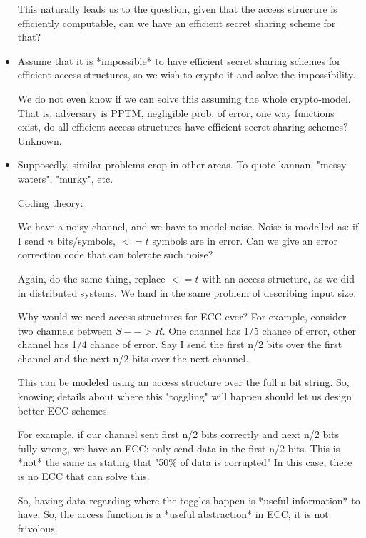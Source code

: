 \begin{itemize}
        This naturally leads us to the question, given that the access
        strucrure is efficiently computable, can we have an efficient
        secret sharing scheme for that?


    \item Assume that it is *impossible* to have efficient secret sharing
        schemes for efficient access structures, so we wish to crypto it
        and solve-the-impossibility.

        We do not even know if we can solve this assuming the whole crypto-model.
        That is, adversary is PPTM, negligible prob. of error, one way
        functions exist, do all efficient access structures have efficient
        secret sharing schemes? Unknown.

    \item Supposedly, similar problems crop in other areas. To quote kannan,
        "messy waters", "murky", etc.


        Coding theory:

        We have a noisy channel, and we have to model noise.
        Noise is modelled as: if I send $n$ bits/symbols, $<= t$ symbols
        are in error. Can we give an error correction code that can 
        tolerate such noise?

        Again, do the same thing, replace $<= t$ with an access structure, as
        we did in distributed systems.  We land in the same problem of
        describing input size.


        Why would we need access structures for ECC ever? For example, consider 
        two channels between $S --> R$. One channel has 1/5 chance of error,
        other channel has 1/4 chance of error. Say I send the first n/2 bits
        over the first channel and the next n/2 bits over the next channel.

        This can be modeled using an access structure over the full n bit
        string. So, knowing details about where this "toggling" will happen
        should let us design better ECC schemes.

        For example, if our channel sent first n/2 bits correctly and next
        n/2 bits fully wrong, we have an ECC: only send data in the first n/2
        bits. This is *not* the same as stating that "50\% of data is corrupted"
        In this case, there is no ECC that can solve this.

        So, having data regarding where the toggles happen is *useful information*
        to have. So, the access function is a *useful abstraction* in ECC, it
        is not frivolous.


\end{itemize}
